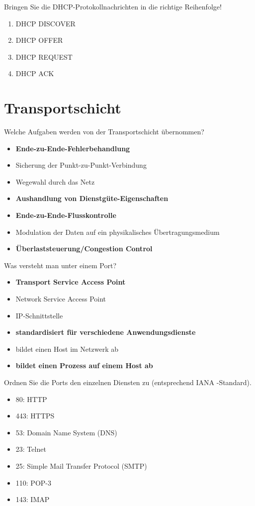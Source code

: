 \documentclass{article}
\begin{document}
	Bringen Sie die DHCP-Protokollnachrichten in die richtige Reihenfolge! 
	\begin{enumerate}
		\item DHCP DISCOVER 
		\item DHCP OFFER 
		\item DHCP REQUEST 
		\item DHCP ACK 
	\end{enumerate}
	
	\section{Transportschicht}
	
	Welche Aufgaben werden von der Transportschicht übernommen? 
	\begin{itemize}
		\item \textbf{Ende-zu-Ende-Fehlerbehandlung}
		\item Sicherung der Punkt-zu-Punkt-Verbindung
		\item Wegewahl durch das Netz
		\item \textbf{Aushandlung von Dienstgüte-Eigenschaften}
		\item \textbf{Ende-zu-Ende-Flusskontrolle}
		\item Modulation der Daten auf ein physikalisches Übertragungsmedium
		\item \textbf{Überlaststeuerung/Congestion Control}
	\end{itemize}

	Was versteht man unter einem Port?
	\begin{itemize}
		\item \textbf{Transport Service Access Point}
		\item Network Service Access Point
		\item IP-Schnittstelle
		\item \textbf{standardisiert für verschiedene Anwendungsdienste}
		\item bildet einen Host im Netzwerk ab
		\item \textbf{bildet einen Prozess auf einem Host ab}
	\end{itemize}

	Ordnen Sie die Ports den einzelnen Diensten zu (entsprechend IANA -Standard). 
	\begin{itemize}
		\item 80: HTTP
		\item 443: HTTPS
		\item 53: Domain Name System (DNS) 
		\item 23: Telnet
		\item 25: Simple Mail Transfer Protocol (SMTP) 
		\item 110: POP-3
		\item 143: IMAP
	\end{itemize}
\end{document}
